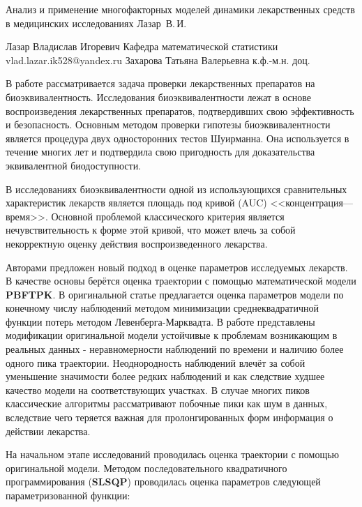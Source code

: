 \begin{vkrthesis}%
	{Анализ и применение многофакторных моделей динамики лекарственных средств в медицинских исследованиях}%
	{Лазар~В.\,И.}%
	
	\VKRAuthorDetailsSupervisorConsultant%
	{Лазар Владислав Игоревич}%
	{Кафедра математической статистики}%
	{vlad.lazar.ik528@yandex.ru}%
	{Захарова Татьяна Валерьевна}%
	{к.ф.-м.н.}%
	{доц.}%
	{}%
	{}
	{}%
	{}%
	
	\newcommand{\tbs}{\textbackslash}
	\newcommand{\todo}[1]{\textcolor{red}{#1}}
	
	В работе рассматривается задача проверки лекарственных препаратов на биоэквивалентность. Исследования биоэквивалентности лежат в основе воспроизведения лекарственных препаратов, подтвердивших свою эффективность и безопасность. Основным методом проверки гипотезы биоэквивалентности является процедура двух односторонних тестов Шуирманна. Она используется в течение многих лет и подтвердила свою пригодность для доказательства эквивалентной биодоступности.
	\par
	В исследованиях биоэквивалентности одной из использующихся сравнительных характеристик лекарств является площадь под кривой (AUC) <<концентрация—время>>. Основной проблемой классического критерия является нечувствительность к форме этой кривой, что может влечь за собой некорректную оценку действия воспроизведенного лекарства.
	\par
	Авторами предложен новый подход в оценке параметров исследуемых лекарств. В качестве основы берётся оценка траектории с помощью математической модели \textbf{PBFTPK}. В оригинальной статье предлагается оценка параметров модели по конечному числу наблюдений методом минимизации среднеквадратичной функции потерь методом Левенберга-Марквадта. В работе представлены модификации оригинальной модели устойчивые к проблемам возникающим в реальных данных - неравномерности наблюдений по времени и наличию более одного пика траектории. Неоднородность наблюдений влечёт за собой уменьшение значимости более редких наблюдений и как следствие худшее качество модели на соответствующих участках. В случае многих пиков классические алгоритмы рассматривают побочные пики как шум в данных, вследствие чего теряется важная для пролонгированных форм информация о действии лекарства.
	\par
	На начальном этапе исследований проводилась оценка траектории с помощью оригинальной модели. Методом последовательного квадратичного программирования (\textbf{SLSQP}) проводилась оценка параметров следующей параметризованной функции:

\end{vkrthesis}
